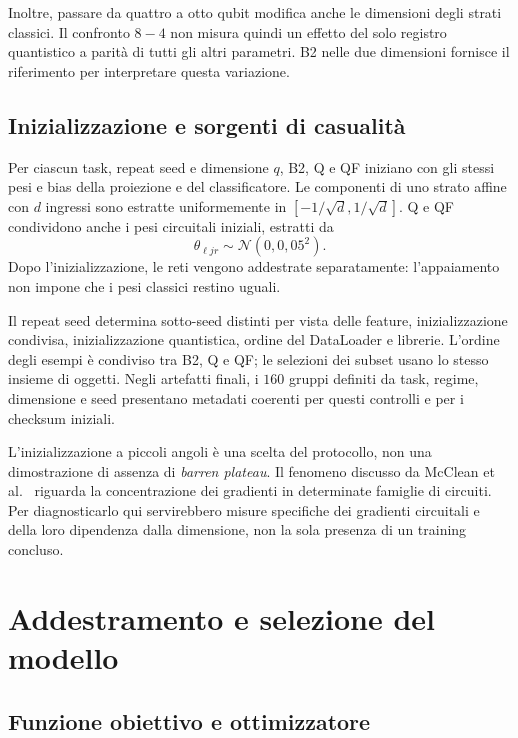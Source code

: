 Inoltre, passare da quattro a otto qubit modifica anche le dimensioni
degli strati classici. Il confronto \(8-4\) non misura quindi un effetto
del solo registro quantistico a parità di tutti gli altri parametri.
B2 nelle due dimensioni fornisce il riferimento per interpretare
questa variazione.

\subsection{Inizializzazione e sorgenti di casualità}

Per ciascun task, repeat seed e dimensione \(q\), B2, Q e QF iniziano
con gli stessi pesi e bias della proiezione e del classificatore.
Le componenti di uno strato affine con \(d\) ingressi sono estratte
uniformemente in \([-1/\sqrt d,1/\sqrt d]\). Q e QF condividono anche
i pesi circuitali iniziali, estratti da
\[
  \theta_{\ell jr}\sim\mathcal N(0,0{,}05^2).
\]
Dopo l'inizializzazione, le reti vengono addestrate separatamente:
l'appaiamento non impone che i pesi classici restino uguali.

Il repeat seed determina sotto-seed distinti per vista delle feature,
inizializzazione condivisa, inizializzazione quantistica, ordine del
DataLoader e librerie. L'ordine degli esempi è condiviso tra B2, Q e QF;
le selezioni dei subset usano lo stesso insieme di oggetti.
Negli artefatti finali, i \(160\) gruppi definiti da
task, regime, dimensione e seed presentano metadati coerenti per
questi controlli e per i checksum iniziali.

L'inizializzazione a piccoli angoli è una scelta del protocollo, non
una dimostrazione di assenza di \emph{barren plateau}. Il fenomeno
discusso da McClean et al.~\cite{mcclean2018barren} riguarda la
concentrazione dei gradienti in determinate famiglie di circuiti.
Per diagnosticarlo qui servirebbero misure specifiche dei gradienti
circuitali e della loro dipendenza dalla dimensione, non la sola
presenza di un training concluso.

\section{Addestramento e selezione del modello}
\label{sec:addestramento}

\subsection{Funzione obiettivo e ottimizzatore}

